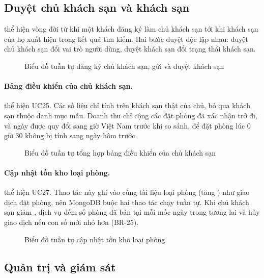 \subsection{Duyệt chủ khách sạn và khách sạn}

 thể hiện vòng đời từ khi một khách đăng ký làm chủ khách sạn tới khi khách sạn của họ xuất hiện trong kết quả tìm kiếm. Hai bước duyệt độc lập nhau: duyệt chủ khách sạn đổi vai trò người dùng, duyệt khách sạn đổi trạng thái khách sạn.

\begin{figure}[H]
\centering
{}
\caption{Biểu đồ tuần tự đăng ký chủ khách sạn, gửi và duyệt khách sạn}\label{fig:seq-approve}
\end{figure}


\paragraph{Bảng điều khiển của chủ khách sạn.}  thể hiện UC25. Các số liệu chỉ tính trên khách sạn thật của chủ, bỏ qua khách sạn thuộc danh mục mẫu. Doanh thu chỉ cộng các đặt phòng đã xác nhận trở đi, và ngày được quy đổi sang giờ Việt Nam trước khi so sánh, để đặt phòng lúc 0 giờ 30 không bị tính sang ngày hôm trước.

\begin{figure}[H]
\centering
{}
\caption{Biểu đồ tuần tự tổng hợp bảng điều khiển của chủ khách sạn}\label{fig:seq-owner-dashboard}
\end{figure}

\paragraph{Cập nhật tồn kho loại phòng.}  thể hiện UC27. Thao tác này ghi vào cùng tài liệu loại phòng (tăng ) như giao dịch đặt phòng, nên MongoDB buộc hai thao tác chạy tuần tự. Khi chủ khách sạn giảm , dịch vụ đếm số phòng đã bán tại mỗi mốc ngày trong tương lai và hủy giao dịch nếu con số mới nhỏ hơn (BR-25).

\begin{figure}[H]
\centering
{}
\caption{Biểu đồ tuần tự cập nhật tồn kho loại phòng}\label{fig:seq-inventory}
\end{figure}

\subsection{Quản trị và giám sát}

